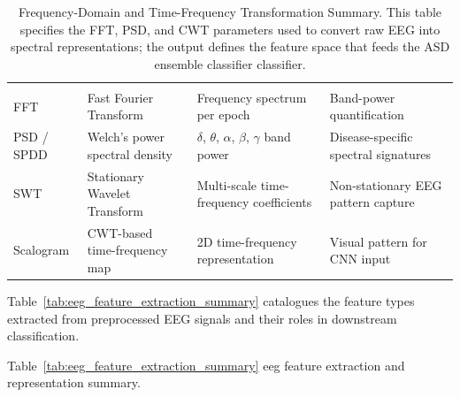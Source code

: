 {\tablestripes\tablefontsize
\begin{xltabular}{\textwidth}{@{} l L L L @{}}
\caption[Frequency-Domain and Time-Frequency Transformation Summary]{Frequency-Domain and Time-Frequency Transformation Summary. This table specifies the FFT, PSD, and CWT parameters used to convert raw EEG into spectral representations; the output defines the feature space that feeds the ASD ensemble classifier classifier.}\label{tab:freq_transform_summary} \\
\toprule
{} &  &  &  \\
\midrule
\endfirsthead
\toprule
{} &  &  &  \\
\midrule
\endhead
\bottomrule
\endlastfoot
FFT & Fast Fourier Transform & Frequency spectrum per epoch & Band-power quantification \\
PSD / SPDD & Welch's power spectral density & $\delta$, $\theta$, $\alpha$, $\beta$, $\gamma$ band power & Disease-specific spectral signatures \\
SWT & Stationary Wavelet Transform & Multi-scale time-frequency coefficients & Non-stationary EEG pattern capture \\
Scalogram & CWT-based time-frequency map & 2D time-frequency representation & Visual pattern for CNN input \\
\end{xltabular}}
\fi %

\noindent Table~\ref{tab:eeg_feature_extraction_summary} catalogues the feature types extracted from preprocessed EEG signals and their roles in downstream classification.

\iffalse %

\noindent Table~\ref{tab:eeg_feature_extraction_summary} eeg feature extraction and representation summary.

